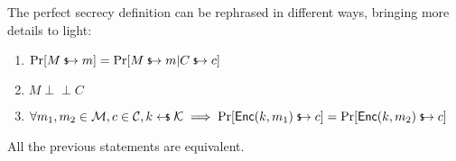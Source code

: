 The perfect secrecy definition can be rephrased in different ways, bringing more details to light:
\begin{enumerate}
    \item $\Pr[M \evaluatesto m] = \Pr[M \evaluatesto m|C \evaluatesto c]$
    \item $M \mathrel{\perp\!\!\!\!\perp} C$ %
    \item $\forall m_1, m_2 \in \M, c \in \C, k \pickUAR \K \implies \Pr[\textsf{Enc}(k, m_1) \evaluatesto c] = \Pr[\textsf{Enc}(k, m_2) \evaluatesto c]$
\end{enumerate}
    
\begin{proposition}
    All the previous statements are equivalent.
\end{proposition}

